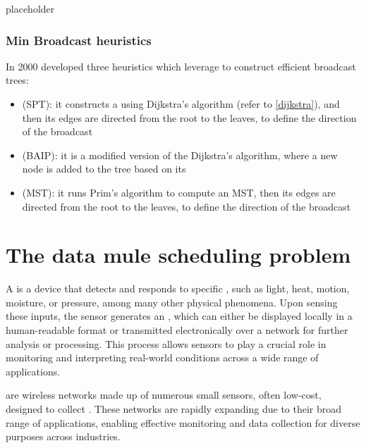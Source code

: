 \documentclass[a4paper, 12pt]{report}
\begin{document}

    placeholder 
    
    \subsection{Min Broadcast heuristics}
    
    In 2000 \textcite{wieselthier} developed three heuristics which leverage  to construct efficient broadcast trees:

    \begin{itemize}
        \item {} (SPT): it constructs a  using Dijkstra's algorithm (refer to \cref{dijkstra}), and then its edges are directed from the root to the leaves, to define the direction of the broadcast
        \item {} (BAIP): it is a modified version of the Dijkstra's algorithm, where a new node is added to the tree based on its 
        \item {} (MST): it runs Prim's algorithm to compute an MST, then its edges are directed from the root to the leaves, to define the direction of the broadcast
    \end{itemize}
    
    \chapter{The data mule scheduling problem}

    A  is a device that detects and responds to specific , such as light, heat, motion, moisture, or pressure, among many other physical phenomena. Upon sensing these inputs, the sensor generates an , which can either be displayed locally in a human-readable format or transmitted electronically over a network for further analysis or processing. This process allows sensors to play a crucial role in monitoring and interpreting real-world conditions across a wide range of applications.

     are wireless networks made up of numerous small sensors, often low-cost, designed to collect . These networks are rapidly expanding due to their broad range of applications, enabling effective monitoring and data collection for diverse purposes across industries.
\end{document}

